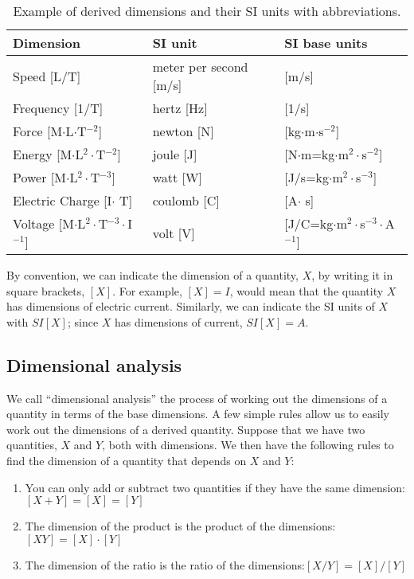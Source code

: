 \begin{table}[!h]
\centering
\begin{tabular}{lll }  
\textbf{Dimension}&\textbf{SI unit}&\textbf{SI base units}\\
\hline
\hline
Speed [L/T]& meter per second [m/s] & [m/s]\\ \hline
Frequency [1/T]& hertz [Hz] & [1/s]\\ \hline
Force [M$\cdot$L$\cdot$T$^{-2}$]& newton [N]&[kg$\cdot$m$\cdot$s$^{-2}$]\\ \hline
Energy [M$\cdot$L$^2\cdot$T$^{-2}$]& joule [J]&[N$\cdot$m=kg$\cdot$m$^2\cdot$s$^{-2}$] \\ \hline
Power [M$\cdot$L$^2\cdot$T$^{-3}$]& watt [W]&[J/s=kg$\cdot$m$^2\cdot$s$^{-3}$]\\ \hline
Electric Charge [I$\cdot$ T]& coulomb [C]&[A$\cdot$ s] \\ \hline
Voltage [M$\cdot$L$^2\cdot$T$^{-3}\cdot$I$^{-1}$]& volt [V]&[J/C=kg$\cdot$m$^2\cdot$s$^{-3}\cdot$A$^{-1}$] \\ \hline
\end{tabular}
\caption{\label{tab:ModelAndExperiment:DerivedSIunits} Example of derived dimensions and their SI units with abbreviations.}
\end{table}

By convention, we can indicate the dimension of a quantity, $X$, by writing it in square brackets, $[X]$. For example, $[X]=I$, would mean that the quantity $X$ has dimensions of electric current. Similarly, we can indicate the SI units of $X$ with $SI[X]$; since $X$ has dimensions of current, $SI[X]=A$.

\subsection{Dimensional analysis}
We call ``dimensional analysis'' the process of working out the dimensions of a quantity in terms of the base dimensions. A few simple rules allow us to easily work out the dimensions of a derived quantity. Suppose that we have two quantities, $X$ and $Y$, both with dimensions. We then have the following rules to find the dimension of a quantity that depends on $X$ and $Y$:
\begin{enumerate}
\item You can only add or subtract two quantities if they have the same dimension: $[X+Y]=[X]=[Y]$
\item The dimension of the product is the product of the dimensions: $[XY]=[X]\cdot[Y]$
\item The dimension of the ratio is the ratio of the dimensions:$[X/Y]=[X]/[Y]$
\end{enumerate}

